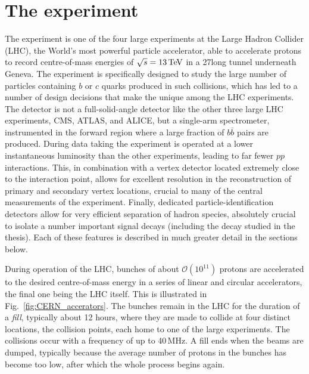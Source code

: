 

\chapter{The \lhcb experiment}
\label{ch:3-detector}


The \lhcb experiment is one of the four large experiments at the Large Hadron Collider (LHC), the World's most powerful particle accelerator, able to accelerate protons to record centre-of-mass energies of $\sqrt{s}=13\text{\,Te\kern -0.1em V}$ in a 27\km long tunnel underneath Geneva. The \lhcb experiment is specifically designed to study the large number of particles containing $b$ or $c$ quarks produced in such collisions, which has led to a number of design decisions that make the \lhcb unique among the LHC experiments. The \lhcb detector is not a full-solid-angle detector like the other three large LHC experiments, CMS, ATLAS, and ALICE, but a single-arm spectrometer, instrumented in the forward region where a large fraction of $b\bar b$ pairs are produced. During data taking the experiment is operated at a lower instantaneous luminosity than the other experiments, leading to far fewer $pp$ interactions. This, in combination with a vertex detector located extremely close to the interaction point, allows for excellent resolution in the reconstruction of primary and secondary vertex locations, crucial to many of the central measurements of the experiment. Finally, dedicated particle-identification detectors allow for very efficient separation of hadron species, absolutely crucial to isolate a number important signal decays (including the \BtoDK decay studied in the thesis). Each of these features is described in much greater detail in the sections below.



During operation of the LHC, bunches of about $\mathcal O(10^{11})$ protons are accelerated to the desired centre-of-mass energy in a series of linear and circular accelerators, the final one being the LHC itself. This is illustrated in Fig.~\ref{fig:CERN_accerators}. The bunches remain in the LHC for the duration of a \emph{fill}, typically about 12 hours, where they are made to collide at four distinct locations, the collision points, each home to one of the large experiments. The collisions occur with a frequency of up to 40\,MHz. A fill ends when the beams are dumped, typically because the average number of protons in the bunches has become too low, after which the whole process begins again.

